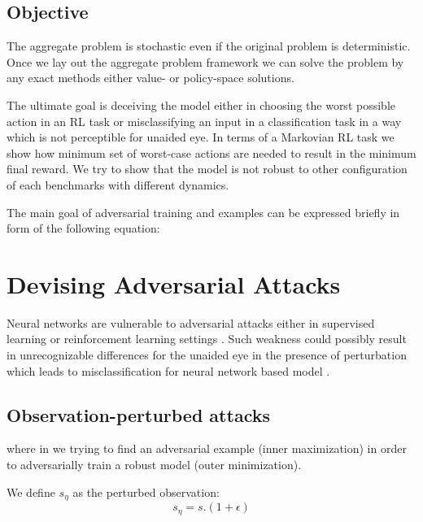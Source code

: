 \documentclass{article}
\begin{document}
    \subsection{Objective}
    The aggregate problem is stochastic even if the original problem is deterministic. Once we lay out the aggregate
    problem framework we can solve the problem by any exact methods either value- or policy-space solutions.


    The ultimate goal is deceiving the model either in choosing the worst possible action in an RL task or misclassifying an input in a classification task in a way which is not perceptible for unaided eye. In terms of a Markovian RL task we show how minimum set of worst-case actions are needed to result in the minimum final reward. We try to show that the model is not robust to other configuration of each benchmarks with different dynamics.

    The main goal of adversarial training and examples can be expressed briefly in form of the following equation:

    \section{Devising Adversarial Attacks}
    Neural networks are vulnerable to adversarial attacks either in supervised learning or reinforcement learning settings \cite{Huang2017}. Such weakness could possibly result in unrecognizable differences for the unaided eye in the presence of perturbation which leads to misclassification for neural network based model \cite{Szegedy2014, Goodfellow2014}.


    \subsection{Observation-perturbed attacks}


    where in we trying to find an adversarial example (inner maximization) in order to adversarially train a robust model (outer minimization).

    We define $s_\eta$ as the perturbed observation:
    \begin{equation}
        s_\eta = s . (1 + \epsilon)
    \end{equation}
\end{document}
